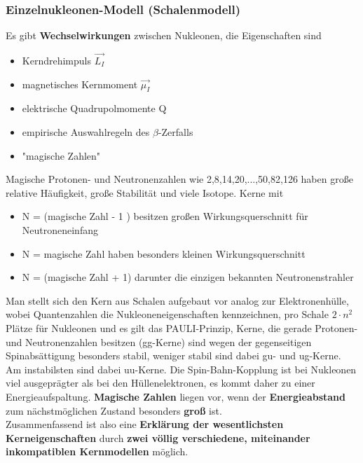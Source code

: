 \documentclass[12pt,a4paper,ngerman]{article}
\begin{document}
\subsubsection*{Einzelnukleonen-Modell (Schalenmodell)}
Es gibt \textbf{Wechselwirkungen} zwischen Nukleonen, die Eigenschaften sind
\begin{itemize}
\item Kerndrehimpuls $\vec{L_I}$
\item magnetisches Kernmoment $\vec{\mu_I}$
\item elektrische Quadrupolmomente Q
\item empirische Auswahlregeln des $\beta$-Zerfalls
\item "magische Zahlen" 
\end{itemize}
Magische Protonen- und Neutronenzahlen wie 2,8,14,20,...,50,82,126 haben große relative Häufigkeit, große Stabilität und viele Isotope. Kerne mit
\begin{itemize}
\item N = (magische Zahl - 1 ) besitzen großen Wirkungsquerschnitt für Neutroneneinfang
\item N = magische Zahl haben besonders kleinen Wirkungsquerschnitt
\item N = (magische Zahl + 1) darunter die einzigen bekannten Neutronenstrahler
\end{itemize}
Man stellt sich den Kern aus Schalen aufgebaut vor analog zur Elektronenhülle, wobei Quantenzahlen die Nukleoneneigenschaften kennzeichnen, pro Schale $2 \cdot n^2$ Plätze für Nukleonen und es gilt das PAULI-Prinzip, Kerne, die gerade Protonen- und Neutronenzahlen besitzen (gg-Kerne) sind wegen der gegenseitigen Spinabsättigung besonders stabil, weniger stabil sind dabei gu- und ug-Kerne. Am instabilsten sind dabei uu-Kerne. 
Die Spin-Bahn-Kopplung ist bei Nukleonen viel ausgeprägter als bei den Hüllenelektronen, es kommt daher zu einer Energieaufspaltung. \textbf{Magische Zahlen} liegen vor, wenn der \textbf{Energieabstand} zum nächstmöglichen Zustand besonders \textbf{groß} ist. \\
Zusammenfassend ist also eine \textbf{Erklärung der wesentlichsten Kerneigenschaften} durch \textbf{zwei völlig verschiedene, miteinander inkompatiblen Kernmodellen} möglich. 
\end{document}

